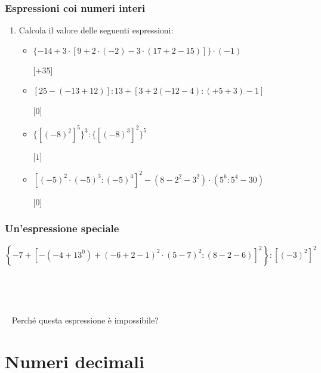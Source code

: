 \documentclass[handout]{beamer}
\theoremstyle{plain}
\begin{document}
\begin{frame}
\frametitle{Espressioni coi numeri interi}
\begin{enumerate}
  \item Calcola il valore delle seguenti espressioni:
  \vspace*{.15cm}
  \begin{itemize}
    \item $  \{-14+3 \cdot [9+ 2 \cdot (-2) - 3 \cdot (17 + 2 - 15)]\} \cdot (-1) $
    
    \hspace{\fill}[$ +35 $]%
    \vspace*{.25cm}
    \item $ [25 - (-13 +12)] : 13 + [3 + 2(-12 - 4) : (+5 + 3) - 1] $
    
    \hspace{\fill}[$ 0 $]%
    \vspace*{.25cm}
    \item $  \{[(-8)^2]^5\}^3 : \{[(-8)^3]^2\}^5 $
    
    \hspace{\fill}[$ 1 $]%
    \vspace*{.25cm}
    \item $ [(-5) ^2\cdot (-5)^3 : (-5)^4]^2 - (8 - 2^2 - 3^2) \cdot  (5^6 : 5^4 - 30) $
    
    \hspace{\fill}[$ 0 $]%
  \end{itemize}
\end{enumerate}
\end{frame}

\begin{frame}
\frametitle{Un'espressione speciale}
\footnotesize{ $ \left\{ -7 + \left[ - (-4 + 13^0) + (-6+2-1)^2 \cdot (5-7)^2 : (8-2-6) \right]^2 \right\} : \left[ (-3)^2 \right]^2 $}\pause%

  ~

  ~

  ~
\normalsize
  Perché questa espressione è \alert{impossibile}?
\end{frame}



\section{Numeri decimali}

\end{document}
